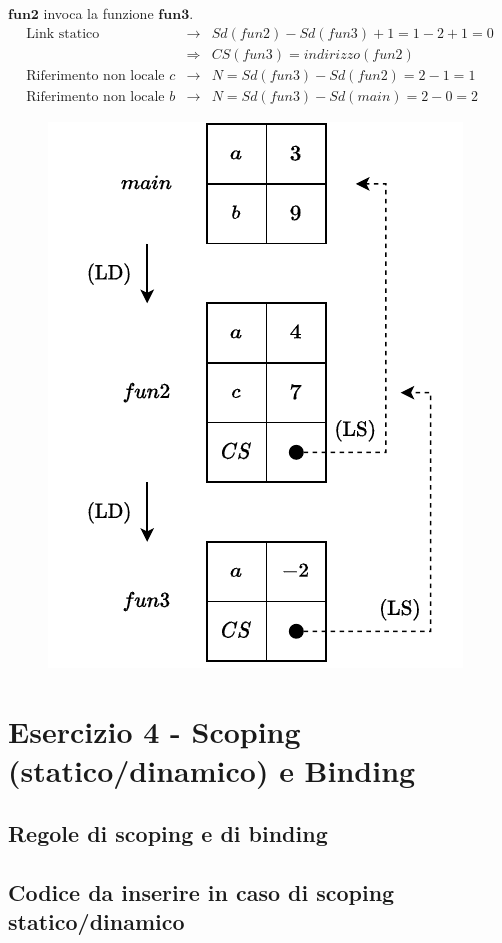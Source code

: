 \documentclass[a4paper]{article}
\begin{document}
	$\mathbf{fun2}$ invoca la funzione $\mathbf{fun3}$.
	\begin{equation*}
		\begin{array}{rcl}
			\text{Link statico} &\rightarrow& Sd(fun2) - Sd(fun3) + 1 = 1 - 2 + 1 = 0 \\ [.3em]
			&\Rightarrow& CS(fun3) = indirizzo(fun2) \\ [.3em]
			\text{Riferimento non locale }c &\rightarrow& N = Sd(fun3) - Sd(fun2) = 2 - 1 = 1 \\ [.3em]
			\text{Riferimento non locale }b &\rightarrow& N = Sd(fun3) - Sd(main) = 2 - 0 = 2
		\end{array}
	\end{equation*}
	\begin{figure}[!htp]
		\centering
		\includegraphics[width=.6\textwidth]{img/ex3-016.pdf}
	\end{figure}
	
	\section{Esercizio 4 - Scoping (statico/dinamico) e Binding}
	
	\subsection{Regole di scoping e di binding}
	
	\subsection{Codice da inserire in caso di scoping statico/dinamico}
	
\end{document}
